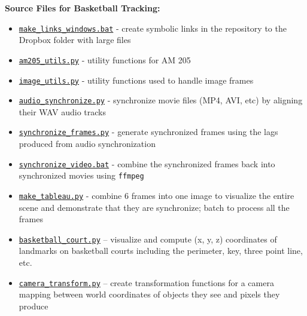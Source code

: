 \documentclass{article}
\begin{document}
\textbf{Source Files for Basketball Tracking:}
\begin{itemize}
\item \href{https://github.com/Harvard-AM-205-Basketball/Basketball/blob/master/src/make_links_windows.bat}
{\texttt{make\_links\_windows.bat}} - create symbolic links in the repository to the Dropbox folder with large files

\item \href{https://github.com/Harvard-AM-205-Basketball/Basketball/blob/master/src/am205_utils.py}
{\texttt{am205\_utils.py}} - utility functions for AM 205

\item \href{https://github.com/Harvard-AM-205-Basketball/Basketball/blob/master/src/image_utils.py}
{\texttt{image\_utils.py}} - utility functions used to handle image frames

\item  \href{https://github.com/Harvard-AM-205-Basketball/Basketball/blob/master/src/audio_synchronize.py}
{\texttt{audio\_synchronize.py}} - synchronize movie files (MP4, AVI, etc) by aligning their WAV audio tracks

\item \href{https://github.com/Harvard-AM-205-Basketball/Basketball/blob/master/src/synchronize_frames.py}
{\texttt{synchronize\_frames.py}} - generate synchronized frames using the lags produced from audio synchronization

\item \href{https://github.com/Harvard-AM-205-Basketball/Basketball/blob/master/src/synchronize_video.bat}
{\texttt{synchronize\_video.bat}} - combine the synchronized frames back into synchronized movies using \texttt{ffmpeg}

\item \href{https://github.com/Harvard-AM-205-Basketball/Basketball/blob/master/src/make_tableaux.py}
{\texttt{make\_tableau.py}} - combine 6 frames into one image to visualize the entire scene and demonstrate that they
are synchronize; batch to process all the frames

\item \href{https://github.com/Harvard-AM-205-Basketball/Basketball/blob/master/src/basketball_court.py}
{\texttt{basketball\_court.py}} -- visualize and compute (x, y, z) coordinates of landmarks on basketball courts including the perimeter, key, three point line, etc.

\item \href{https://github.com/Harvard-AM-205-Basketball/Basketball/blob/master/src/camera_transform.py}
{\texttt{camera\_transform.py}} -- create transformation functions for a camera mapping 
between world coordinates of objects they see and pixels they produce


\end{itemize}
\end{document}
